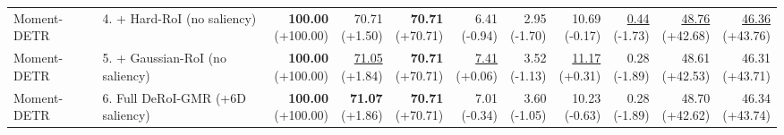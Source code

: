 \documentclass{article}
\begin{document}
{\begin{tabular}{llrrrrrrrrr}
Moment-DETR & 4. + Hard-RoI (no saliency) & \shortstack{\textbf{100.00} \\ {\scriptsize (+100.00)}} & \shortstack{70.71 \\ {\scriptsize (+1.50)}} & \shortstack{\textbf{70.71} \\ {\scriptsize (+70.71)}} & \shortstack{6.41 \\ {\scriptsize (-0.94)}} & \shortstack{2.95 \\ {\scriptsize (-1.70)}} & \shortstack{10.69 \\ {\scriptsize (-0.17)}} & \shortstack{\underline{0.44} \\ {\scriptsize (-1.73)}} & \shortstack{\underline{48.76} \\ {\scriptsize (+42.68)}} & \shortstack{\underline{46.36} \\ {\scriptsize (+43.76)}} \\
Moment-DETR & 5. + Gaussian-RoI (no saliency) & \shortstack{\textbf{100.00} \\ {\scriptsize (+100.00)}} & \shortstack{\underline{71.05} \\ {\scriptsize (+1.84)}} & \shortstack{\textbf{70.71} \\ {\scriptsize (+70.71)}} & \shortstack{\underline{7.41} \\ {\scriptsize (+0.06)}} & \shortstack{3.52 \\ {\scriptsize (-1.13)}} & \shortstack{\underline{11.17} \\ {\scriptsize (+0.31)}} & \shortstack{0.28 \\ {\scriptsize (-1.89)}} & \shortstack{48.61 \\ {\scriptsize (+42.53)}} & \shortstack{46.31 \\ {\scriptsize (+43.71)}} \\
Moment-DETR & 6. Full DeRoI-GMR (+6D saliency) & \shortstack{\textbf{100.00} \\ {\scriptsize (+100.00)}} & \shortstack{\textbf{71.07} \\ {\scriptsize (+1.86)}} & \shortstack{\textbf{70.71} \\ {\scriptsize (+70.71)}} & \shortstack{7.01 \\ {\scriptsize (-0.34)}} & \shortstack{3.60 \\ {\scriptsize (-1.05)}} & \shortstack{10.23 \\ {\scriptsize (-0.63)}} & \shortstack{0.28 \\ {\scriptsize (-1.89)}} & \shortstack{48.70 \\ {\scriptsize (+42.62)}} & \shortstack{46.34 \\ {\scriptsize (+43.74)}} \\

\end{tabular}}
\end{document}
